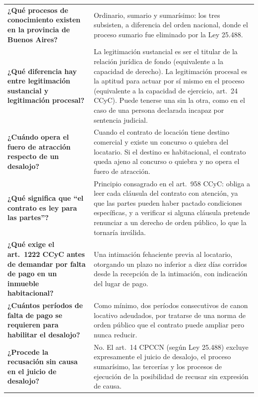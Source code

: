 \documentclass[12pt,oneside]{book}
\begin{document}
\begin{longtable}{p{} p{}}
\textbf{¿Qué procesos de conocimiento existen en la provincia de Buenos Aires?} &
Ordinario, sumario y sumarísimo: los tres subsisten, a diferencia del orden nacional, donde el proceso sumario fue eliminado por la Ley 25.488. \\

\textbf{¿Qué diferencia hay entre legitimación sustancial y legitimación procesal?} &
La legitimación sustancial es ser el titular de la relación jurídica de fondo (equivalente a la capacidad de derecho). La legitimación procesal es la aptitud para actuar por sí mismo en el proceso (equivalente a la capacidad de ejercicio, art.\ 24 CCyC). Puede tenerse una sin la otra, como en el caso de una persona declarada incapaz por sentencia judicial. \\

\textbf{¿Cuándo opera el fuero de atracción respecto de un desalojo?} &
Cuando el contrato de locación tiene destino comercial y existe un concurso o quiebra del locatario. Si el destino es habitacional, el contrato queda ajeno al concurso o quiebra y no opera el fuero de atracción. \\

\textbf{¿Qué significa que ``el contrato es ley para las partes''?} &
Principio consagrado en el art.\ 958 CCyC: obliga a leer cada cláusula del contrato con atención, ya que las partes pueden haber pactado condiciones específicas, y a verificar si alguna cláusula pretende renunciar a un derecho de orden público, lo que la tornaría inválida. \\

\textbf{¿Qué exige el art.\ 1222 CCyC antes de demandar por falta de pago en un inmueble habitacional?} &
Una intimación fehaciente previa al locatario, otorgando un plazo no inferior a diez días corridos desde la recepción de la intimación, con indicación del lugar de pago. \\

\textbf{¿Cuántos períodos de falta de pago se requieren para habilitar el desalojo?} &
Como mínimo, dos períodos consecutivos de canon locativo adeudados, por tratarse de una norma de orden público que el contrato puede ampliar pero nunca reducir. \\

\textbf{¿Procede la recusación sin causa en el juicio de desalojo?} &
No. El art.\ 14 CPCCN (según Ley 25.488) excluye expresamente el juicio de desalojo, el proceso sumarísimo, las tercerías y los procesos de ejecución de la posibilidad de recusar sin expresión de causa. \\


\end{longtable}
\end{document}

